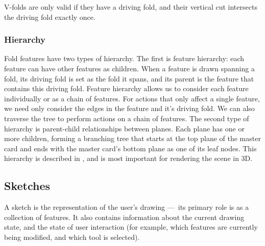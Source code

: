 V-folds are only valid if they have a driving fold, and their vertical
cut intersects the driving fold exactly once.

\subsubsection{Hierarchy}\label{hierarchy}

Fold features have two types of hierarchy. The first is feature
hierarchy: each feature can have other features as children. When a
feature is drawn spanning a fold, its driving fold is set as the fold it
spans, and its parent is the feature that contains this driving fold.
Feature hierarchy allows us to consider each feature individually or as
a chain of features. For actions that only affect a single feature, we
need only consider the edges in the feature and it's driving fold. We
can also traverse the tree to perform actions on a chain of features.
The second type of hierarchy is parent-child relationships between
planes. Each plane has one or more children, forming a branching tree
that starts at the top plane of the master card and ends with the master
card's bottom plane as one of its leaf nodes. This hierarchy is
described in \citet{mallen}, and is most important for rendering the
scene in 3D.

\subsection{Sketches}\label{sketches}

A sketch is the representation of the user's drawing ---~its primary
role is as a collection of features. It also contains information about
the current drawing state, and the state of user interaction (for
example, which features are currently being modified, and which tool is
selected).
